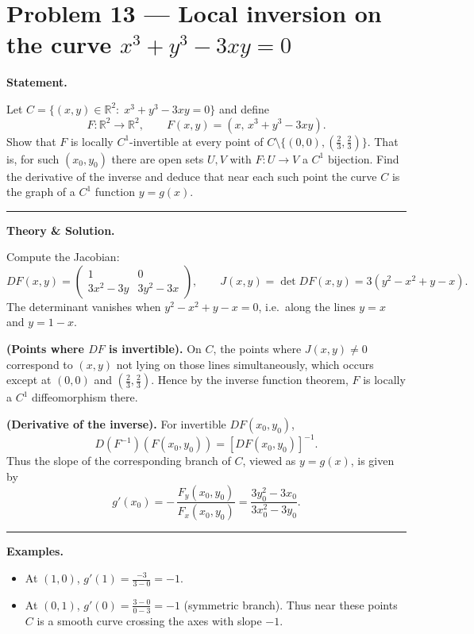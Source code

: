 \documentclass[12pt,a4paper]{article}
\theoremstyle{plain}
\theoremstyle{definition}
\theoremstyle{remark}
\theoremstyle{remark}
\newcommand{\gap}{\vspace{6pt}}
\begin{document}
\section*{Problem 13 — Local inversion on the curve $x^3+y^3-3xy=0$}

\textbf{Statement.}\gap

Let $C=\{(x,y)\in\mathbb{R}^2:\; x^3+y^3-3xy=0\}$ and define
\[
F:\mathbb{R}^2\longrightarrow\mathbb{R}^2,\qquad F(x,y)=(x,\,x^3+y^3-3xy).
\]
Show that $F$ is locally $C^1$-invertible at every point of
$C\setminus\{(0,0),(\tfrac{2}{3},\tfrac{2}{3})\}$.
That is, for such $(x_0,y_0)$ there are open sets
$U,V$ with $F:U\to V$ a $C^1$ bijection.
Find the derivative of the inverse and deduce that near each such point
the curve $C$ is the graph of a $C^1$ function $y=g(x)$.

\bigskip\hrule\bigskip

\textbf{Theory \& Solution.}\gap

Compute the Jacobian:
\[
DF(x,y)=
\begin{pmatrix}
	1 & 0\\[4pt]
	3x^2-3y & 3y^2-3x
\end{pmatrix},
\qquad
J(x,y)=\det DF(x,y)=3(y^2-x^2+y-x).
\]
The determinant vanishes when $y^2-x^2+y-x=0$, i.e.\
along the lines $y=x$ and $y=1-x$.

\medskip

\textbf{(Points where $DF$ is invertible).}\;
On $C$, the points where $J(x,y)\ne0$
correspond to $(x,y)$ not lying on those lines simultaneously,
which occurs except at $(0,0)$ and $(\tfrac{2}{3},\tfrac{2}{3})$.
Hence by the inverse function theorem, $F$ is locally a $C^1$ diffeomorphism there.

\medskip

\textbf{(Derivative of the inverse).}\;
For invertible $DF(x_0,y_0)$,
\[
D(F^{-1})(F(x_0,y_0)) = [DF(x_0,y_0)]^{-1}.
\]
Thus the slope of the corresponding branch of $C$,
viewed as $y=g(x)$, is given by
\[
g'(x_0)= -\,\frac{F_y(x_0,y_0)}{F_x(x_0,y_0)}
= \frac{3y_0^2-3x_0}{3x_0^2-3y_0}.
\]

\bigskip\hrule\bigskip

\textbf{Examples.}\gap
\begin{itemize}\setlength{\itemsep}{6pt}
	\item At $(1,0)$, $g'(1)=\tfrac{-3}{3-0}=-1$.
	\item At $(0,1)$, $g'(0)=\tfrac{3-0}{0-3}=-1$ (symmetric branch).
	Thus near these points $C$ is a smooth curve crossing the axes with slope $-1$.
\end{itemize}
\end{document}
